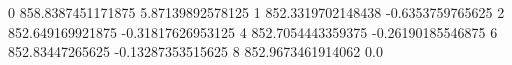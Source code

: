 0 858.8387451171875 5.87139892578125
1 852.3319702148438 -0.6353759765625
2 852.649169921875 -0.31817626953125
4 852.7054443359375 -0.26190185546875
6 852.83447265625 -0.13287353515625
8 852.9673461914062 0.0
